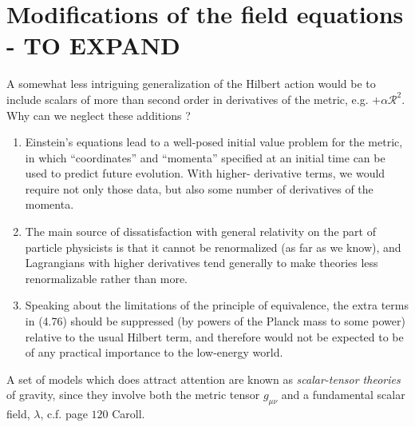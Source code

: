  
 
 \section{Modifications of the field equations -  TO EXPAND}
 A somewhat less intriguing generalization of the Hilbert action would be to include scalars
 of more than second order in derivatives of the metric, e.g. $+\alpha \mathcal{R}^2$. Why can we neglect these additions ?
 \begin{enumerate}
 	\item Einstein’s
 	equations lead to a well-posed initial value problem for the metric, in which “coordinates” and
 	“momenta” specified at an initial time can be used to predict future evolution. With higher-
 	derivative terms, we would require not only those data, but also some number of derivatives
 	of the momenta.
 	\item The main source of dissatisfaction with general relativity on the part
 	of particle physicists is that it cannot be renormalized (as far as we know), and Lagrangians
 	with higher derivatives tend generally to make theories less renormalizable rather than more.
 	\item Speaking about the limitations of the
 	principle of equivalence, the extra terms in (4.76) should be suppressed (by powers of the
 	Planck mass to some power) relative to the usual Hilbert term, and therefore would not be
 	expected to be of any practical importance to the low-energy world.
 \end{enumerate}
 A set of models which does attract attention are known as \emph{scalar-tensor theories} of
 gravity, since they involve both the metric tensor $g_{μν}$ and a fundamental scalar field, $λ$, c.f. page $120$ Caroll.
 
 
 
